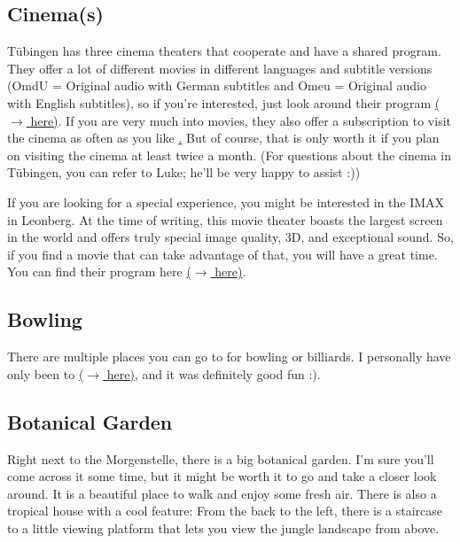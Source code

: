 \subsection{Cinema(s)}
Tübingen has three cinema theaters that cooperate and have a shared program. They offer a lot of different movies in different languages and subtitle versions (OmdU = Original audio with German subtitles and Omeu = Original audio with English subtitles), so if you're interested, just look around their program \href{https://tuebinger-kinos.de/programmuebersicht/}{($\xrightarrow{}$ here)}.
If you are very much into movies, they also offer a subscription to visit the cinema as often as you like \href{https://tuebinger-kinos.de/unlimited/}. But of course, that is only worth it if you plan on visiting the cinema at least twice a month.
(For questions about the cinema in Tübingen, you can refer to Luke; he'll be very happy to assist :))

If you are looking for a special experience, you might be interested in the IMAX in Leonberg. At the time of writing, this movie theater boasts the largest screen in the world and offers truly special image quality, 3D, and exceptional sound. So, if you find a movie that can take advantage of that, you will have a great time. You can find their program here \href{https://imax.traumpalast.de/index.php/PID/11295.html}{($\xrightarrow{}$ here)}.

\subsection{Bowling}
There are multiple places you can go to for bowling or billiards. I personally have only been to  \href{https://maps.app.goo.gl/dgMVABnYTJC7qGBT8}{($\xrightarrow{}$ here)}, and it was definitely good fun :).  

\subsection{Botanical Garden}
Right next to the Morgenstelle, there is a big botanical garden. I'm sure you'll come across it some time, but it might be worth it to go and take a closer look around. It is a beautiful place to walk and enjoy some fresh air. There is also a tropical house with a cool feature: From the back to the left, there is a staircase to a little viewing platform that lets you view the jungle landscape from above.